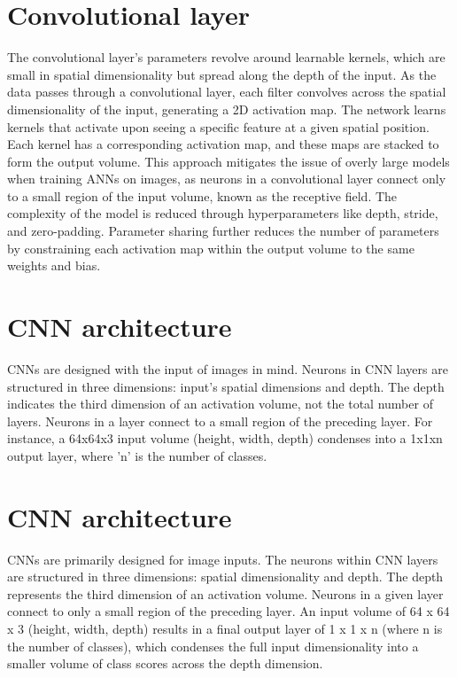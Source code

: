 \documentclass{article}
\begin{document}
\section*{Convolutional layer}

The convolutional layer's parameters revolve around learnable kernels, which are small in spatial dimensionality but spread along the depth of the input. As the data passes through a convolutional layer, each filter convolves across the spatial dimensionality of the input, generating a 2D activation map. The network learns kernels that activate upon seeing a specific feature at a given spatial position. Each kernel has a corresponding activation map, and these maps are stacked to form the output volume. This approach mitigates the issue of overly large models when training ANNs on images, as neurons in a convolutional layer connect only to a small region of the input volume, known as the receptive field. The complexity of the model is reduced through hyperparameters like depth, stride, and zero-padding. Parameter sharing further reduces the number of parameters by constraining each activation map within the output volume to the same weights and bias.

\section*{CNN architecture}

CNNs are designed with the input of images in mind. Neurons in CNN layers are structured in three dimensions: input's spatial dimensions and depth. The depth indicates the third dimension of an activation volume, not the total number of layers. Neurons in a layer connect to a small region of the preceding layer. For instance, a 64x64x3 input volume (height, width, depth) condenses into a 1x1xn output layer, where 'n' is the number of classes.

\section*{CNN architecture}

CNNs are primarily designed for image inputs. The neurons within CNN layers are structured in three dimensions: spatial dimensionality and depth. The depth represents the third dimension of an activation volume. Neurons in a given layer connect to only a small region of the preceding layer. An input volume of 64 x 64 x 3 (height, width, depth) results in a final output layer of 1 x 1 x n (where n is the number of classes), which condenses the full input dimensionality into a smaller volume of class scores across the depth dimension.
\end{document}
